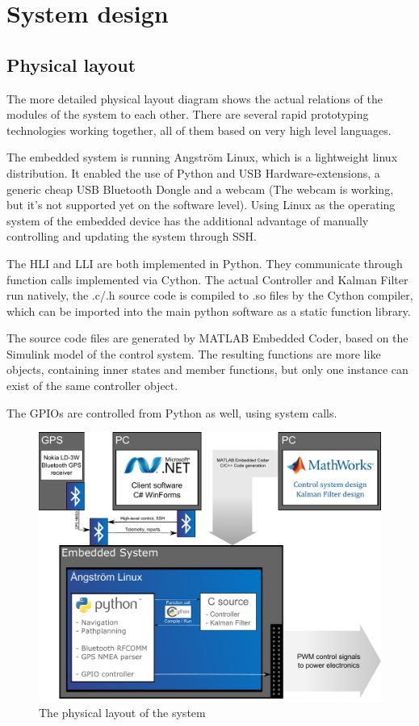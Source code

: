 \section{System design}

\subsection{Physical layout}

The more detailed physical layout diagram shows the actual relations of the modules of the system to each other. There are several rapid prototyping technologies working together, all of them based on very high level languages.

The embedded system is running Angström Linux, which is a lightweight linux distribution. It enabled the use of Python and USB Hardware-extensions, a generic cheap USB Bluetooth Dongle and a webcam (The webcam is working, but it’s not supported yet on the software level).
Using Linux as the operating system of the embedded device has the additional advantage of manually controlling and updating the system through SSH.

The HLI and LLI are both implemented in Python. They communicate through function calls implemented via Cython. The actual Controller and Kalman Filter run natively, the .c/.h source code is compiled to .so files by the Cython compiler, which can be imported into the main python software as a static function library.

The source code files are generated by MATLAB Embedded Coder, based on the Simulink model of the control system. The resulting functions are more like objects, containing inner states and member functions, but only one instance can exist of the same controller object.

The GPIOs are controlled from Python as well, using system calls.

\begin{figure}[H]
	\centering
	\includegraphics[width=1\textwidth]{img2/PhysicalLayout}
	\caption{The physical layout of the system}
	\label{fig:PhysicalLayout}
\end{figure}

